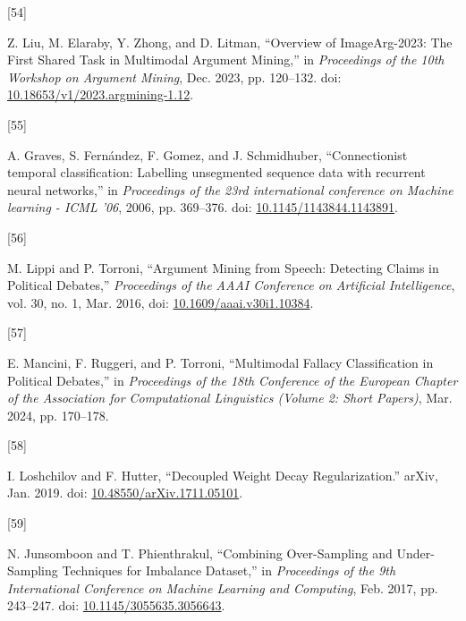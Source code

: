 \documentclass[twocolumn]{article}
\newlength{\cslhangindent}
\newlength{\csllabelwidth}
\newenvironment{CSLReferences}[2] %
 {\begin{list}{}{%
  \setlength{\itemindent}{0pt}
  \setlength{\leftmargin}{0pt}
  \setlength{\parsep}{0pt}
  \ifodd #1
   \setlength{\leftmargin}{\cslhangindent}
   \setlength{\itemindent}{-1\cslhangindent}
  \fi
  \setlength{\itemsep}{#2\baselineskip}}}
 {\end{list}}
\newcommand{\CSLLeftMargin}[1]{\parbox[t]{\csllabelwidth}{\strut#1\strut}}
\newcommand{\CSLRightInline}[1]{\parbox[t]{\linewidth - \csllabelwidth}{\strut#1\strut}}
\begin{document}
\begin{CSLReferences}{0}{0}
\CSLLeftMargin{{[}54{]} }%
\CSLRightInline{Z. Liu, M. Elaraby, Y. Zhong, and D. Litman, {``Overview
of {ImageArg-2023}: {The First Shared Task} in {Multimodal Argument
Mining},''} in \emph{Proceedings of the 10th {Workshop} on {Argument
Mining}}, Dec. 2023, pp. 120--132. doi:
\href{https://doi.org/10.18653/v1/2023.argmining-1.12}{10.18653/v1/2023.argmining-1.12}.}

\CSLLeftMargin{{[}55{]} }%
\CSLRightInline{A. Graves, S. Fernández, F. Gomez, and J. Schmidhuber,
{``Connectionist temporal classification: Labelling unsegmented sequence
data with recurrent neural networks,''} in \emph{Proceedings of the 23rd
international conference on {Machine} learning - {ICML} '06}, 2006, pp.
369--376. doi:
\href{https://doi.org/10.1145/1143844.1143891}{10.1145/1143844.1143891}.}

\CSLLeftMargin{{[}56{]} }%
\CSLRightInline{M. Lippi and P. Torroni, {``Argument {Mining} from
{Speech}: {Detecting Claims} in {Political Debates},''}
\emph{Proceedings of the AAAI Conference on Artificial Intelligence},
vol. 30, no. 1, Mar. 2016, doi:
\href{https://doi.org/10.1609/aaai.v30i1.10384}{10.1609/aaai.v30i1.10384}.}

\CSLLeftMargin{{[}57{]} }%
\CSLRightInline{E. Mancini, F. Ruggeri, and P. Torroni, {``Multimodal
{Fallacy Classification} in {Political Debates},''} in \emph{Proceedings
of the 18th {Conference} of the {European Chapter} of the {Association}
for {Computational Linguistics} ({Volume} 2: {Short Papers})}, Mar.
2024, pp. 170--178.}

\CSLLeftMargin{{[}58{]} }%
\CSLRightInline{I. Loshchilov and F. Hutter, {``Decoupled {Weight Decay
Regularization}.''} arXiv, Jan. 2019. doi:
\href{https://doi.org/10.48550/arXiv.1711.05101}{10.48550/arXiv.1711.05101}.}

\CSLLeftMargin{{[}59{]} }%
\CSLRightInline{N. Junsomboon and T. Phienthrakul, {``Combining
{Over-Sampling} and {Under-Sampling Techniques} for {Imbalance
Dataset},''} in \emph{Proceedings of the 9th {International Conference}
on {Machine Learning} and {Computing}}, Feb. 2017, pp. 243--247. doi:
\href{https://doi.org/10.1145/3055635.3056643}{10.1145/3055635.3056643}.}


\end{CSLReferences}
\end{document}
